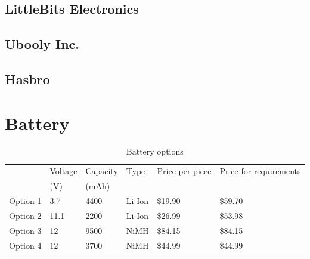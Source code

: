 \documentclass[11pt,twoside,a4paper]{report}
\begin{document}
\begin{appendices}
\section{LittleBits Electronics}
\section{Ubooly Inc.}
\section{Hasbro}
\chapter{Battery}
\begin{table}[h]
\caption{Battery options}
\begin{tabular}{llllll}
  & Voltage  & Capacity & Type  & Price per piece & Price for requirements          \\
         & (V)      & (mAh) &                 &                        &         \\
Option 1 & 3.7      & 4400  & Li-Ion          & \$19.90                & \$59.70 \\
Option 2 & 11.1     & 2200  & Li-Ion          & \$26.99                & \$53.98 \\
Option 3 & 12       & 9500  & NiMH            & \$84.15                & \$84.15 \\
Option 4 & 12       & 3700  & NiMH            & \$44.99                & \$44.99
\end{tabular}
\label{table:batteryOptions}
\end{table}


\end{appendices}
\end{document}

